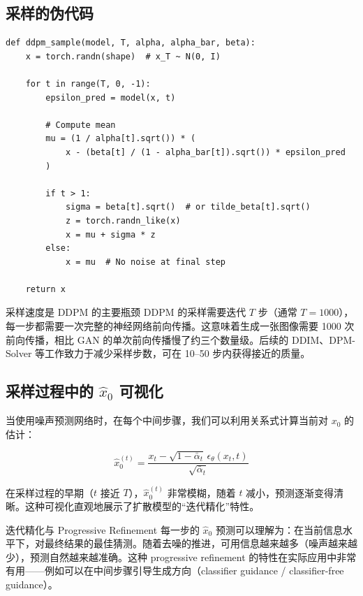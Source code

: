 \documentclass[a4paper]{article}
\begin{document}
\subsection{采样的伪代码}

\begin{lstlisting}[caption={DDPM 采样算法}, label=lst:sample]
def ddpm_sample(model, T, alpha, alpha_bar, beta):
    x = torch.randn(shape)  # x_T ~ N(0, I)

    for t in range(T, 0, -1):
        epsilon_pred = model(x, t)

        # Compute mean
        mu = (1 / alpha[t].sqrt()) * (
            x - (beta[t] / (1 - alpha_bar[t]).sqrt()) * epsilon_pred
        )

        if t > 1:
            sigma = beta[t].sqrt()  # or tilde_beta[t].sqrt()
            z = torch.randn_like(x)
            x = mu + sigma * z
        else:
            x = mu  # No noise at final step

    return x
\end{lstlisting}

\begin{warningbox}{采样速度是 DDPM 的主要瓶颈}
DDPM 的采样需要迭代 $T$ 步（通常 $T = 1000$），每一步都需要一次完整的神经网络前向传播。这意味着生成一张图像需要 1000 次前向传播，相比 GAN 的单次前向传播慢了约三个数量级。后续的 DDIM、DPM-Solver 等工作致力于减少采样步数，可在 10--50 步内获得接近的质量。
\end{warningbox}

\subsection{采样过程中的 $\hat{x}_0$ 可视化}

当使用噪声预测网络时，在每个中间步骤，我们可以利用关系式计算当前对 $x_0$ 的估计：

$$\hat{x}_0^{(t)} = \frac{x_t - \sqrt{1-\bar{\alpha}_t}\, \epsilon_\theta(x_t, t)}{\sqrt{\bar{\alpha}_t}}$$

在采样过程的早期（$t$ 接近 $T$），$\hat{x}_0^{(t)}$ 非常模糊，随着 $t$ 减小，预测逐渐变得清晰。这种可视化直观地展示了扩散模型的``迭代精化''特性。

\begin{knowledgebox}{迭代精化与 Progressive Refinement}
每一步的 $\hat{x}_0$ 预测可以理解为：在当前信息水平下，对最终结果的最佳猜测。随着去噪的推进，可用信息越来越多（噪声越来越少），预测自然越来越准确。这种 progressive refinement 的特性在实际应用中非常有用——例如可以在中间步骤引导生成方向（classifier guidance / classifier-free guidance）。
\end{knowledgebox}
\end{document}
